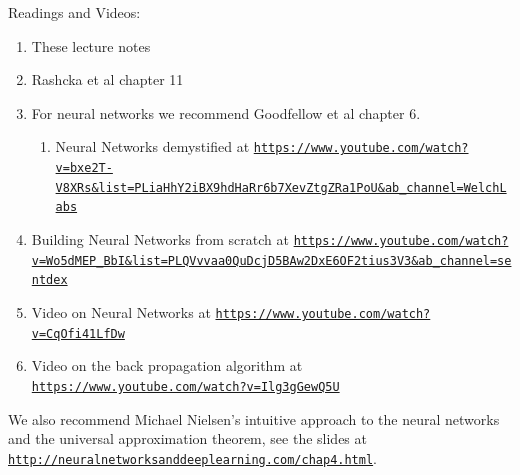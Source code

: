 \documentclass[%
oneside,                 %
final,                   %
10pt]{article}
\begin{document}
\noindent
\begin{block}{Readings and Videos: }
\begin{enumerate}
\item These lecture notes

\item Rashcka et al chapter 11 

\item For neural networks we recommend Goodfellow et al chapter 6.
\begin{enumerate}

 \item Neural Networks demystified at \href{{https://www.youtube.com/watch?v=bxe2T-V8XRs&list=PLiaHhY2iBX9hdHaRr6b7XevZtgZRa1PoU&ab_channel=WelchLabs}}{\nolinkurl{https://www.youtube.com/watch?v=bxe2T-V8XRs&list=PLiaHhY2iBX9hdHaRr6b7XevZtgZRa1PoU&ab_channel=WelchLabs}}

\end{enumerate}

\noindent
\item Building Neural Networks from scratch at \href{{https://www.youtube.com/watch?v=Wo5dMEP_BbI&list=PLQVvvaa0QuDcjD5BAw2DxE6OF2tius3V3&ab_channel=sentdex}}{\nolinkurl{https://www.youtube.com/watch?v=Wo5dMEP_BbI&list=PLQVvvaa0QuDcjD5BAw2DxE6OF2tius3V3&ab_channel=sentdex}}

\item Video on Neural Networks at \href{{https://www.youtube.com/watch?v=CqOfi41LfDw}}{\nolinkurl{https://www.youtube.com/watch?v=CqOfi41LfDw}}

\item Video on the back propagation algorithm at \href{{https://www.youtube.com/watch?v=Ilg3gGewQ5U}}{\nolinkurl{https://www.youtube.com/watch?v=Ilg3gGewQ5U}}
\end{enumerate}

\noindent
We also  recommend Michael Nielsen's intuitive approach to the neural networks and the universal approximation theorem, see the slides at \href{{http://neuralnetworksanddeeplearning.com/chap4.html}}{\nolinkurl{http://neuralnetworksanddeeplearning.com/chap4.html}}.
\end{block}

\end{document}
